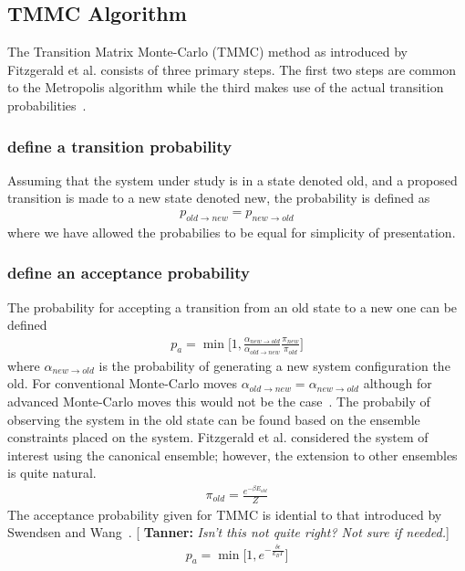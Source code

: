 \documentclass[letterpaper,twocolumn,amsmath,amssymb,pre,aps,10pt]{revtex4-1}
\newcommand{\cyan}[1]{{\bf \color{cyan} #1}}
\newcommand{\tssays}[1]{{\color{red} [\cyan{Tanner:} \emph{#1}]}}
\begin{document}
\subsection{TMMC Algorithm}
The Transition Matrix Monte-Carlo (TMMC) method as introduced by
Fitzgerald et al. consists of three primary steps.  The first two steps
are common to the Metropolis algorithm while the third makes use of the
actual transition probabilities~\cite{fitzgerald2000monte}.

\subsubsection{define a transition probability}
Assuming that the system under study is in a state denoted old, and a
proposed transition is made to a new state denoted new, the probability
is defined as
\begin{align}
  p_{old \rightarrow new} = p_{new \rightarrow old}
\end{align}
where we have allowed the probabilies to be equal for simplicity of
presentation.

\subsubsection{define an acceptance probability}
The probability for accepting a transition from an old state to a new
one can be defined
\begin{align}
  p_{a} = \min\bigg[1,\frac{\alpha_{new\rightarrow old}}
  {\alpha_{old \rightarrow new}}\frac{\pi_{new}}{\pi_{old}}\bigg]
\end{align}
where $\alpha_{new\rightarrow old}$ is the probability of generating a
new system configuration the old.  For conventional Monte-Carlo moves
$\alpha_{old \rightarrow new} =\alpha_{new\rightarrow old}$ although
for advanced Monte-Carlo moves this would not be the
case~\cite{paluch2008comparing, siepmann1990method}.  The probabily of
observing the system in the old state can be found based on the
ensemble constraints placed on the system.  Fitzgerald et al.
considered the system of interest using the canonical ensemble;
however, the extension to other ensembles is quite natural.
\begin{align}
  \pi_{old} = \frac{e^{-\beta E_{old}}}{Z}
\end{align}
The acceptance probability given for TMMC is idential to that
introduced by Swendsen and Wang~\cite{wang2002transition}. \tssays{Isn't
this not quite right? Not sure if needed.}
\begin{align}
  p_{a} = \min\bigg[1,e^{-\frac{\delta\epsilon}{k_{B} T}}\bigg]
\end{align}
\end{document}
